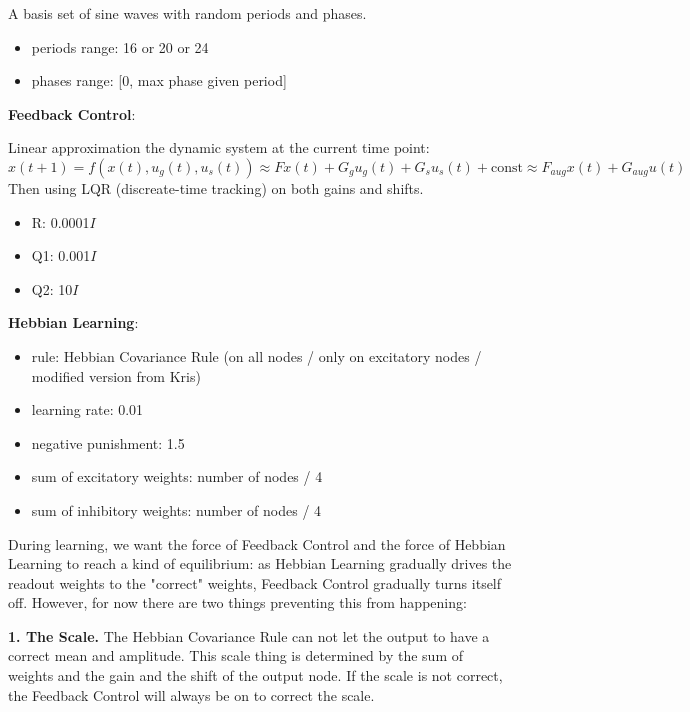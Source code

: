 \documentclass[12pt, a4paper]{article}
\begin{document}
A basis set of sine waves with random periods and phases.

\begin{itemize}
    \item periods range: 16 or 20 or 24 
    \item phases range: [0, max phase given period]
\end{itemize}

\noindent
\textbf{Feedback Control}:

Linear approximation the dynamic system at the current time point: $$x(t+1) = f(x(t), u_g(t), u_s(t)) \approx  Fx(t) + G_gu_g(t) + G_su_s(t) + \text{const} \approx  F_{aug}x(t) + G_{aug}u(t)$$
Then using LQR (discreate-time tracking) on both gains and shifts.

\begin{itemize}
    \item R: 0.0001$I$
    \item Q1: 0.001$I$
    \item Q2: 10$I$
\end{itemize}

\noindent
\textbf{Hebbian Learning}:

\begin{itemize}
    \item rule: Hebbian Covariance Rule (on all nodes / only on excitatory nodes / modified version from Kris)
    \item learning rate: 0.01
    \item negative punishment: 1.5
    \item sum of excitatory weights: number of nodes / 4
    \item sum of inhibitory weights: number of nodes / 4
\end{itemize}

\newpage

During learning, we want the force of Feedback Control and the force of Hebbian Learning to reach a kind of equilibrium: as Hebbian Learning gradually drives the readout weights to the "correct" weights, Feedback Control gradually turns itself off. However, for now there are two things preventing this from happening:

\noindent
\textbf{1. The Scale.} The Hebbian Covariance Rule can not let the output to have a correct mean and amplitude. This scale thing is determined by the sum of weights and the gain and the shift of the output node. If the scale is not correct, the Feedback Control will always be on to correct the scale.
\end{document}
